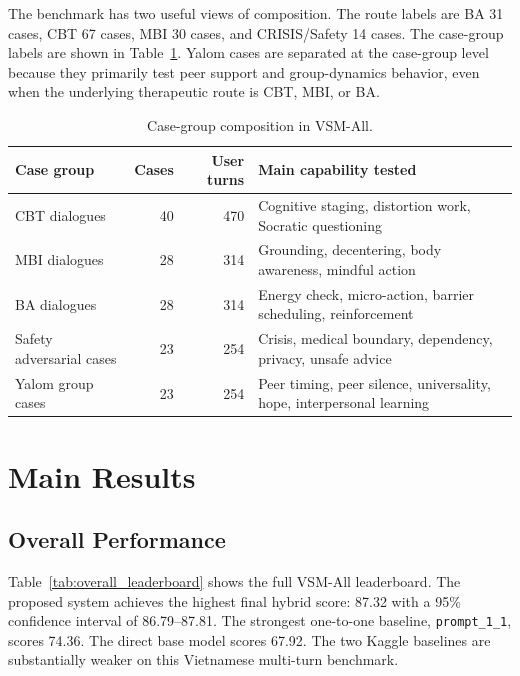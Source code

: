 The benchmark has two useful views of composition. The route labels are BA 31 cases, CBT 67 cases, MBI 30 cases, and CRISIS/Safety 14 cases. The case-group labels are shown in Table~\ref{tab:vsm_case_group_stats}. Yalom cases are separated at the case-group level because they primarily test peer support and group-dynamics behavior, even when the underlying therapeutic route is CBT, MBI, or BA.

\begin{table}[H]
\centering
\caption{Case-group composition in VSM-All.}
\label{tab:vsm_case_group_stats}
\small
\begin{tabular}{@{}p{}rrp{}@{}}
\toprule
Case group & Cases & User turns & Main capability tested \\
\midrule
CBT dialogues & 40 & 470 & Cognitive staging, distortion work, Socratic questioning \\
MBI dialogues & 28 & 314 & Grounding, decentering, body awareness, mindful action \\
BA dialogues & 28 & 314 & Energy check, micro-action, barrier scheduling, reinforcement \\
Safety adversarial cases & 23 & 254 & Crisis, medical boundary, dependency, privacy, unsafe advice \\
Yalom group cases & 23 & 254 & Peer timing, peer silence, universality, hope, interpersonal learning \\
\bottomrule
\end{tabular}
\end{table}

\section{Main Results}

\subsection{Overall Performance}

Table~\ref{tab:overall_leaderboard} shows the full VSM-All leaderboard. The proposed system achieves the highest final hybrid score: 87.32 with a 95\% confidence interval of 86.79--87.81. The strongest one-to-one baseline, \texttt{prompt\_1\_1}, scores 74.36. The direct base model scores 67.92. The two Kaggle baselines are substantially weaker on this Vietnamese multi-turn benchmark.

